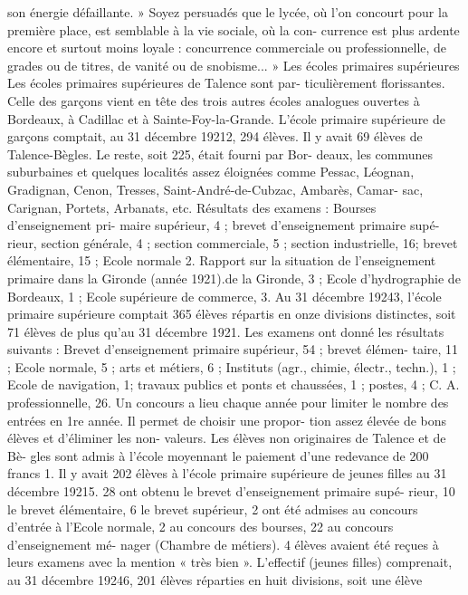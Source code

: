 \documentclass[a4paper,11pt]{book}
\begin{document}
son énergie défaillante.
» Soyez persuadés que le lycée, où l'on concourt pour la
première place, est semblable à la vie sociale, où la con-
currence est plus ardente encore et surtout moins loyale :
concurrence commerciale ou professionnelle, de grades ou
de titres, de vanité ou de snobisme... »
Les écoles primaires supérieures
Les écoles primaires supérieures de Talence sont par-
ticulièrement florissantes. Celle des garçons vient en tête
des trois autres écoles analogues ouvertes à Bordeaux, à
Cadillac et à Sainte-Foy-la-Grande.
L'école primaire supérieure de garçons comptait, au
31 décembre 19212, 294 élèves. Il y avait 69 élèves de
Talence-Bègles. Le reste, soit 225, était fourni par Bor-
deaux, les communes suburbaines et quelques localités
assez éloignées comme Pessac, Léognan, Gradignan,
Cenon, Tresses, Saint-André-de-Cubzac, Ambarès, Camar-
sac, Carignan, Portets, Arbanats, etc.
Résultats des examens : Bourses d'enseignement pri-
maire supérieur, 4 ; brevet d'enseignement primaire supé-
rieur, section générale, 4 ; section commerciale, 5 ; section
industrielle, 16; brevet élémentaire, 15 ; Ecole normale
2. Rapport sur la situation de l'enseignement primaire dans la Gironde
(année 1921).de la Gironde, 3 ; Ecole d'hydrographie de Bordeaux, 1 ;
Ecole supérieure de commerce, 3.
Au 31 décembre 19243, l'école primaire supérieure
comptait 365 élèves répartis en onze divisions distinctes,
soit 71 élèves de plus qu'au 31 décembre 1921.
Les examens ont donné les résultats suivants : Brevet
d'enseignement primaire supérieur, 54 ; brevet élémen-
taire, 11 ; Ecole normale, 5 ; arts et métiers, 6 ; Instituts
(agr., chimie, électr., techn.), 1 ; Ecole de navigation, 1;
travaux publics et ponts et chaussées, 1 ; postes, 4 ; C. A.
professionnelle, 26.
Un concours a lieu chaque année pour limiter le nombre
des entrées en 1re année. Il permet de choisir une propor-
tion assez élevée de bons élèves et d'éliminer les non-
valeurs. Les élèves non originaires de Talence et de Bè-
gles sont admis à l'école moyennant le paiement d'une
redevance de 200 francs 1.
Il y avait 202 élèves à l'école primaire supérieure de
jeunes filles au 31 décembre 19215.
28 ont obtenu le brevet d'enseignement primaire supé-
rieur, 10 le brevet élémentaire, 6 le brevet supérieur, 2 ont
été admises au concours d'entrée à l'Ecole normale, 2 au
concours des bourses, 22 au concours d'enseignement mé-
nager (Chambre de métiers).
4 élèves avaient été reçues à leurs examens avec la
mention « très bien ».
L'effectif (jeunes filles) comprenait, au 31 décembre
19246, 201 élèves réparties en huit divisions, soit une élève
\end{document}
